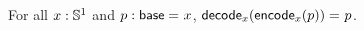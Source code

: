 \documentclass[hott-all.tex]{subfiles}
\begin{document}
% 
% 
% 
\begin{lem} 
For all $x: \mathbb{S} ^1$ and $p : \mathsf{base} =_{} x$, $\mathsf{decode}_x({{\mathsf{encode}_x(p)}}) =_{} p$.
\end{lem}
% 
\end{document}
